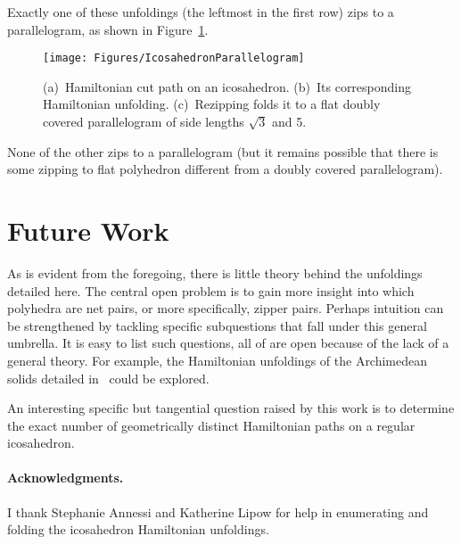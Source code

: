 \pdfoutput=1  \documentclass[]{article}
\newcommand{\figlab}[1]{\label{fig:#1}}
\newcommand{\seclab}[1]{\label{sec:#1}}
\newcommand{\figref}[1]{\ref{fig:#1}}
\begin{document}
Exactly one of these unfoldings (the leftmost
in the first row) zips to a parallelogram, as 
shown in 
Figure~\figref{IcosahedronParallelogram}.
\begin{figure}[htbp]
\centering
\texttt{[image: Figures/IcosahedronParallelogram]}
\caption{(a)~Hamiltonian cut path on an icosahedron.
(b)~Its corresponding Hamiltonian unfolding.
(c)~Rezipping folds it to
a flat doubly covered parallelogram
of side lengths $\sqrt{3}$ and 5.}
\figlab{IcosahedronParallelogram}
\end{figure}
None of the other zips to a parallelogram 
(but it remains
possible that there is some zipping to flat polyhedron different
from a doubly covered parallelogram).

\section{Future Work}
\seclab{Future}
As is evident from the foregoing, there is little theory behind the
unfoldings detailed here.
The central open problem is to gain more insight into which polyhedra
are net pairs, or more specifically, zipper pairs.
Perhaps intuition can be strengthened by tackling specific subquestions that
fall under this general umbrella.  It is easy to list such questions,
all of are open because of the lack of a general theory.
For example, the Hamiltonian unfoldings of the Archimedean solids
detailed in~\cite{lddss-zupc-10} could be explored.

An interesting specific but tangential question raised by this work is to determine the exact
number of geometrically distinct Hamiltonian paths on a regular icosahedron.


\paragraph{Acknowledgments.}
I thank Stephanie Annessi and Katherine Lipow for help in enumerating
and folding the
icosahedron Hamiltonian unfoldings.



\end{document}
